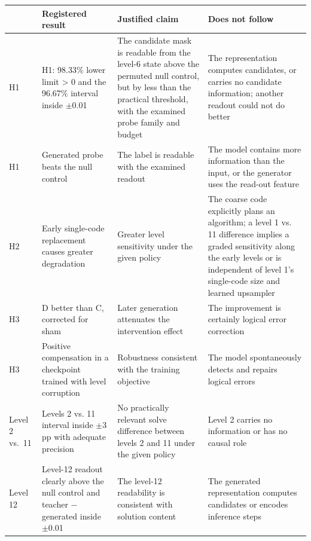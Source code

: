 \begin{tabular}{p{1.3cm} p{3.9cm} p{4.3cm} p{5.2cm}}
\toprule
 & Registered result & Justified claim & Does not follow \\
\midrule
H1 & H1: 98.33\% lower limit > 0 and the 96.67\% interval inside $\pm$0.01 & The candidate mask is readable from the level-6 state above the permuted null control, but by less than the practical threshold, with the examined probe family and budget & The representation computes candidates, or carries no candidate information; another readout could not do better \\
H1 & Generated probe beats the null control & The label is readable with the examined readout & The model contains more information than the input, or the generator uses the read-out feature \\
H2 & Early single-code replacement causes greater degradation & Greater level sensitivity under the given policy & The coarse code explicitly plans an algorithm; a level 1 vs. 11 difference implies a graded sensitivity along the early levels or is independent of level 1's single-code size and learned upsampler \\
H3 & D better than C, corrected for sham & Later generation attenuates the intervention effect & The improvement is certainly logical error correction \\
H3 & Positive compensation in a checkpoint trained with level corruption & Robustness consistent with the training objective & The model spontaneously detects and repairs logical errors \\
Level 2 vs.\ 11 & Levels 2 vs. 11 interval inside $\pm$3 pp with adequate precision & No practically relevant solve difference between levels 2 and 11 under the given policy & Level 2 carries no information or has no causal role \\
Level 12 & Level-12 readout clearly above the null control and teacher $-$ generated inside $\pm$0.01 & The level-12 readability is consistent with solution content & The generated representation computes candidates or encodes inference steps \\
\bottomrule
\end{tabular}
